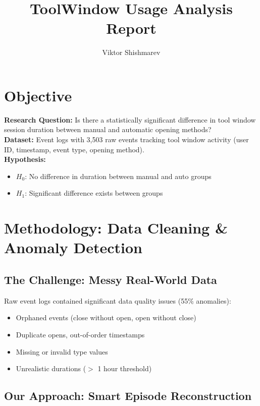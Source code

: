 \documentclass[11pt,a4paper]{article}
\title{\textbf{ToolWindow Usage Analysis Report}}
\author{Viktor Shishmarev}
\begin{document}
\maketitle

\section{Objective}

\textbf{Research Question:} Is there a statistically significant difference in tool window session duration between manual and automatic opening methods?
\\
\textbf{Dataset:} Event logs with 3,503 raw events tracking tool window activity (user ID, timestamp, event type, opening method).
\\
\textbf{Hypothesis:}
\begin{itemize}
    \item $H_0$: No difference in duration between manual and auto groups
    \item $H_1$: Significant difference exists between groups
\end{itemize}

\section{Methodology: Data Cleaning \& Anomaly Detection}

\subsection{The Challenge: Messy Real-World Data}

Raw event logs contained significant data quality issues (55\% anomalies):
\begin{itemize}
    \item Orphaned events (close without open, open without close)
    \item Duplicate opens, out-of-order timestamps
    \item Missing or invalid type values
    \item Unrealistic durations ($>$ 1 hour threshold)
\end{itemize}

\subsection{Our Approach: Smart Episode Reconstruction}
\end{document}
